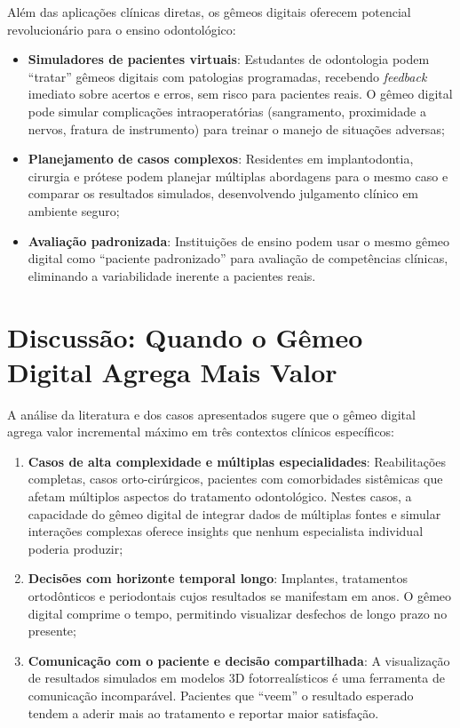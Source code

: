 Além das aplicações clínicas diretas, os gêmeos digitais oferecem potencial revolucionário para o ensino odontológico:

\begin{itemize}
    \item \textbf{Simuladores de pacientes virtuais}: Estudantes de odontologia podem ``tratar'' gêmeos digitais com patologias programadas, recebendo \textit{feedback} imediato sobre acertos e erros, sem risco para pacientes reais. O gêmeo digital pode simular complicações intraoperatórias (sangramento, proximidade a nervos, fratura de instrumento) para treinar o manejo de situações adversas;

    \item \textbf{Planejamento de casos complexos}: Residentes em implantodontia, cirurgia e prótese podem planejar múltiplas abordagens para o mesmo caso e comparar os resultados simulados, desenvolvendo julgamento clínico em ambiente seguro;

    \item \textbf{Avaliação padronizada}: Instituições de ensino podem usar o mesmo gêmeo digital como ``paciente padronizado'' para avaliação de competências clínicas, eliminando a variabilidade inerente a pacientes reais.
\end{itemize}

\section{Discussão: Quando o Gêmeo Digital Agrega Mais Valor}

A análise da literatura e dos casos apresentados sugere que o gêmeo digital agrega valor incremental máximo em três contextos clínicos específicos:

\begin{enumerate}
    \item \textbf{Casos de alta complexidade e múltiplas especialidades}: Reabilitações completas, casos orto-cirúrgicos, pacientes com comorbidades sistêmicas que afetam múltiplos aspectos do tratamento odontológico. Nestes casos, a capacidade do gêmeo digital de integrar dados de múltiplas fontes e simular interações complexas oferece insights que nenhum especialista individual poderia produzir;

    \item \textbf{Decisões com horizonte temporal longo}: Implantes, tratamentos ortodônticos e periodontais cujos resultados se manifestam em anos. O gêmeo digital comprime o tempo, permitindo visualizar desfechos de longo prazo no presente;

    \item \textbf{Comunicação com o paciente e decisão compartilhada}: A visualização de resultados simulados em modelos 3D fotorrealísticos é uma ferramenta de comunicação incomparável. Pacientes que ``veem'' o resultado esperado tendem a aderir mais ao tratamento e reportar maior satisfação.
\end{enumerate}

